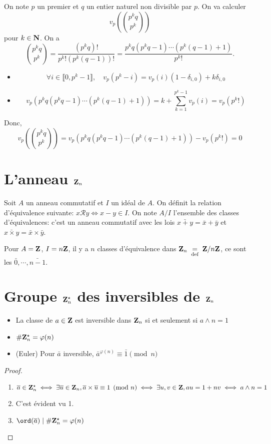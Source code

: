 On note $p$ un premier et $q$ un entier naturel non divisible par $p$. On va calculer \[
    v_p \left( \binom{p^kq}{p^k} \right)
\]
pour $k\in\mathbf N$. On a \[
    \binom{p^kq}{p^k}=\frac{(p^kq)!}{p^k!(p^k(q-1))!}=\frac{p^kq(p^kq-1)\cdots (p^k(q-1)+1)}{p^k!}.
\]
\begin{itemize}
    \item \[
            \forall i\in\llbracket 0, p^k-1\rrbracket, \quad v_p(p^k-i)=v_p(i)(1-\delta_{i,0})+k\delta_{i,0}
        \]
    \item \[
            v_p(p^kq(p^kq-1)\cdots (p^k(q-1)+1))=k+\sum_{k=1}^{p^k-1}v_p(i)=v_p(p^k!)
        \]
\end{itemize}
Donc, \[
    v_p \left( \binom{p^kq}{p^k} \right)=v_p(p^kq(p^kq-1)\cdots (p^k(q-1)+1))-v_p(p^k!)=0
\]

\section{L'anneau $\mathbf Z_n$}

Soit $A$ un anneau commutatif et $I$ un idéal de $A$. On définit la relation d'équivalence suivante: $x\mathcal Ry\iff x-y\in I$. On note $A/I$ l'ensemble des classes d'équivalences: c'est un anneau commutatif avec les lois $\bar{x+y}=\bar x+\bar y$ et $\bar{x\times y}=\bar x\times \bar y$.

Pour $A=\mathbf Z$, $I=n\mathbf Z$, il y a $n$ classes d'équivalence dans $\mathbf Z_n\;\underset{\text{def}}=\;\mathbf Z/n\mathbf Z$, ce sont les $\bar 0, \cdots , \bar{n-1}$.

\section{Groupe $\mathbf Z_n^\star$ des inversibles de $\mathbf Z_n$}

\begin{prop}
    \begin{itemize}
        \item La classe de $a\in\mathbf Z$ est inversible dans $\mathbf Z_n$ si et seulement si $a\land n=1$
        \item $\#\mathbf Z_n^\star=\varphi(n)$
        \item (Euler) Pour $\bar a$ inversible, $\bar a^{\varphi(n)}\equiv \bar 1\pmod n$
    \end{itemize}
\end{prop}

\begin{proof}~
    \begin{enumerate}
        \item $\overline{a}\in\mathbf Z_n^\star\iff \exists \overline{u}\in\mathbf Z_n, \overline{a}\times \overline{u}\equiv 1\pmod n\iff \exists u, v\in\mathbf Z, au=1+nv \iff a\land n=1$
        \item C'est évident vu 1.
        \item $\ord(\bar a)\;|\;\#\Z_n^\star=\varphi(n)$
    \end{enumerate}
\end{proof}

